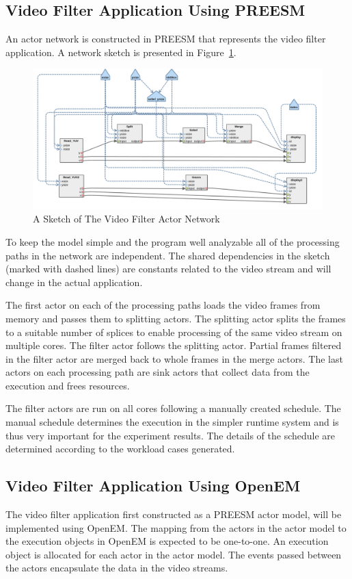 \subsection{Video Filter Application Using PREESM}
An actor network is constructed in PREESM that represents the video filter application. A network sketch is presented in Figure~\ref{sketch}.
\begin{figure}[h!]
\begin{center}
\includegraphics[width=1.3\textwidth,natwidth=2250,natheight=1090]{preesm_gauss.png}
\caption{A Sketch of The Video Filter Actor Network}\label{sketch}
\end{center}
\end{figure}
To keep the model simple and the program well analyzable all of the processing paths in the network are independent. The shared dependencies in the sketch (marked with dashed lines) are constants related to the video stream and will change in the actual application.

The first actor on each of the processing paths loads the video frames from memory and passes them to splitting actors. The splitting actor splits the frames to a suitable number of splices to enable processing of the same video stream on multiple cores. The filter actor follows the splitting actor. Partial frames filtered in the filter actor are merged back to whole frames in the merge actors. The last actors on each processing path are sink actors that collect data from the execution and frees resources.

The filter actors are run on all cores following a manually created schedule. The manual schedule determines the execution in the simpler runtime system and is thus very important for the experiment results. The details of the schedule are determined according to the workload cases generated.
\subsection{Video Filter Application Using OpenEM}
The video filter application first constructed as a PREESM actor model, will be implemented using OpenEM. The mapping from the actors in the actor model to the execution objects in OpenEM is expected to be one-to-one. An execution object is allocated for each actor in the actor model. The events passed between the actors encapsulate the data in the video streams.

